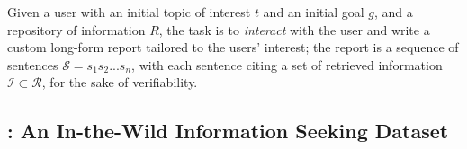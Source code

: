 \documentclass[11pt]{article}
\begin{document}
Given a user with an initial topic of interest $t$ and an initial goal $g$, and a repository of information $R$, the task is to {\em interact} with the user and write a custom long-form report tailored to the users' interest; the report is a sequence of sentences $\mathcal{S}=s_1s_2...s_n$, with each sentence citing a set of retrieved information $\mathcal{I} \subset \mathcal{R}$,  for the sake of verifiability.

\subsection{\data: An In-the-Wild Information Seeking Dataset}
\label{sec:task_data}
\begin{table}
\centering
{}
    \caption{A sample data point in the \data dataset for studying complex information-seeking tasks; the topic and goal are provided by users on the publicly available STORM website, the domain is assigned manually.}
    \label{tab:data_point}
\vspace{-1em}
\end{table}
\end{document}
